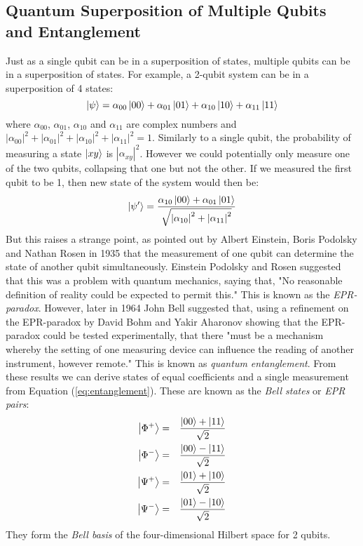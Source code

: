 \documentclass[reqno]{amsart}
\numberwithin{equation}{section}
\numberwithin{figure}{section}
\begin{document}
\subsection{Quantum Superposition of Multiple Qubits and Entanglement}
\begin{justify}
    Just as a single qubit can be in a superposition of states, multiple qubits can be in a superposition of states. For example, a 2-qubit system can be in a superposition of 4 states:
    \begin{equation}
        \ket{\psi} = \alpha_{00}\ket{00} + \alpha_{01}\ket{01} + \alpha_{10}\ket{10} + \alpha_{11}\ket{11} \label{eq:entanglement}
    \end{equation}
    where $\alpha_{00}$, $\alpha_{01}$, $\alpha_{10}$ and $\alpha_{11}$ are complex numbers and $|\alpha_{00}|^{2} + |\alpha_{01}|^{2} + |\alpha_{10}|^{2} + |\alpha_{11}|^{2} = 1$. Similarly to a single qubit, the probability of measuring a state $\ket{xy}$ is $|\alpha_{xy}|^{2}$. However we could potentially only measure one of the two qubits, collapsing that one but not the other. If we measured the first qubit to be 1, then new state of the system would then be:
    \begin{equation}
        \ket{\psi'} = \frac{\alpha_{10}\ket{00}+\alpha_{01}\ket{01}}{\sqrt{\abs{\alpha_{10}}^{2} + \abs{\alpha_{11}}^{2}}}
    \end{equation}
    But this raises a strange point, as pointed out by Albert Einstein, Boris Podolsky and Nathan Rosen in 1935 \cite{EinsteinPodolskyRosen1935} that the measurement of one qubit can determine the state of another qubit simultaneously. Einstein Podolsky and Rosen suggested that this was a problem with quantum mechanics, saying that, "No reasonable definition of reality could be expected to permit this." This is known as the \textit{EPR-paradox}. However, later in 1964 John Bell suggested that, using a refinement on the EPR-paradox by David Bohm and Yakir Aharonov \cite{BohmAharonov1957} showing that the EPR-paradox could be tested experimentally, that there "must be a mechanism whereby the setting of one measuring device can influence the reading of another instrument, however remote." \cite{Bell1964} This is known as \textit{quantum entanglement}. From these results we can derive states of equal coefficients and a single measurement from Equation (\ref{eq:entanglement}). These are known as the \textit{Bell states} or \textit{EPR pairs}: 
        \begin{eqnarray}
            \ket{\Phi^{+}} &=& \frac{\ket{00} + \ket{11}}{\sqrt{2}} \label{eqn:bellphi+} \\
            \ket{\Phi^{-}} &=& \frac{\ket{00} - \ket{11}}{\sqrt{2}} \label{eqn:bellphi-} \\
            \ket{\Psi^{+}} &=& \frac{\ket{01} + \ket{10}}{\sqrt{2}} \label{eqn:bellpsi+} \\
            \ket{\Psi^{-}} &=& \frac{\ket{01} - \ket{10}}{\sqrt{2}} \label{eqn:bellpsi-} 
        \end{eqnarray}
They form the \textit{Bell basis} of the four-dimensional Hilbert space for 2 qubits.
\end{justify}
\end{document}

